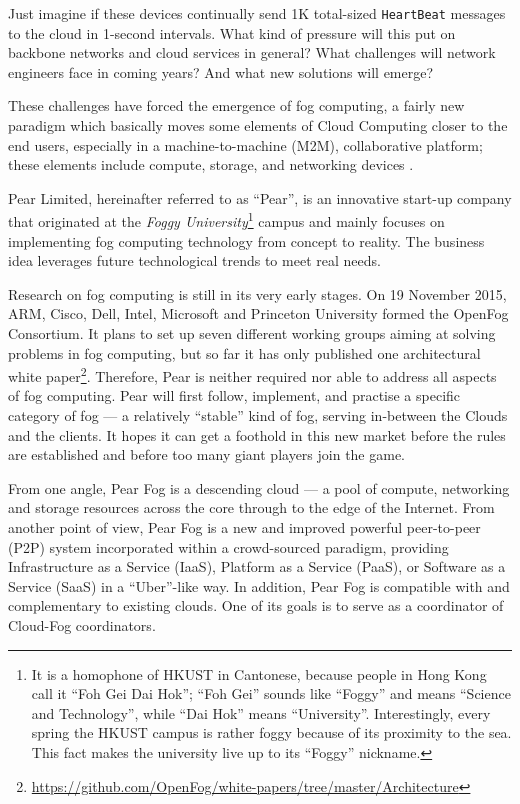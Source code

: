 Just imagine if these devices continually send 1K total-sized \texttt{HeartBeat} messages to the cloud in 1-second intervals. 
What kind of pressure will this put on backbone networks and cloud services in general? What challenges will network engineers face in coming years? And what new solutions will emerge? 

These challenges have forced the emergence of fog computing, a fairly new paradigm which basically moves some elements of Cloud Computing closer to the end users, especially in a machine-to-machine (M2M), collaborative platform; these elements include compute, storage, and networking devices \cite{Bonomi:2012:Fog:IoT}. 

Pear Limited, hereinafter referred to as ``Pear'', is an innovative start-up company that originated at the \emph{Foggy University}\footnote{It is a homophone of HKUST in Cantonese, because people in Hong Kong call it ``Foh Gei Dai Hok''; ``Foh Gei'' sounds like ``Foggy'' and means ``Science and Technology'', while ``Dai Hok'' means ``University''. Interestingly, every spring the HKUST campus is rather foggy because of its proximity to the sea. This fact makes the university live up to its ``Foggy'' nickname.} campus and mainly focuses on implementing fog computing technology from concept to reality. The business idea leverages future technological trends to meet real needs. 

Research on fog computing is still in its very early stages. On 19 November 2015, ARM, Cisco, Dell, Intel, Microsoft and Princeton University formed the OpenFog Consortium. It plans to set up seven different working groups aiming at solving problems in fog computing, but so far it has only published one architectural white paper\footnote{\url{https://github.com/OpenFog/white-papers/tree/master/Architecture}}. Therefore, Pear is neither required nor able to address all aspects of fog computing. Pear will first follow, implement, and practise a specific category of fog --- a relatively ``stable'' kind of fog, serving in-between the Clouds and the clients. It hopes it can get a foothold in this new market before the rules are established and before too many giant players join the game.

From one angle, Pear Fog is a descending cloud --- a pool of compute, networking and storage resources across the core through to the edge of the Internet. From another point of view, Pear Fog is a new and improved powerful peer-to-peer (P2P) system incorporated within a crowd-sourced paradigm, providing Infrastructure as a Service (IaaS), Platform as a Service (PaaS), or Software as a Service (SaaS) in a ``Uber''-like way. 
In addition, Pear Fog is compatible with and complementary to existing clouds. One of its goals is to serve as a coordinator of Cloud-Fog coordinators. 

